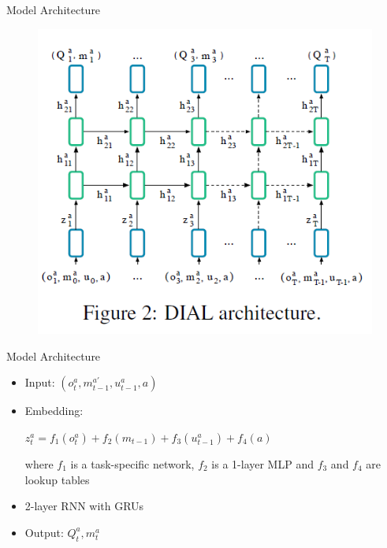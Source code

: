 \documentclass[mathserif]{beamer}
\begin{document}
\begin{frame}{Model Architecture}
  \begin{figure}
    \centering
    \includegraphics[scale=1]{fig/3}
  \end{figure}
\end{frame}

\begin{frame}{Model Architecture}
  \begin{itemize}
    \item Input: $(o_{t}^{a},m_{t-1}^{a'},u_{t-1}^{a},a)$
    \item Embedding:

    $z_{t}^{a}=f_{1}(o_{t}^{a})+f_{2}(m_{t-1})+f_{3}(u_{t-1}^{a})+f_{4}(a)$

    where $f_{1}$ is a task-specific network, $f_{2}$ is a 1-layer MLP and
    $f_{3}$ and $f_{4}$ are lookup tables
    \item 2-layer RNN with GRUs
    \item Output: $Q_{t}^{a},m_{t}^{a}$
  \end{itemize}
\end{frame}
\end{document}
